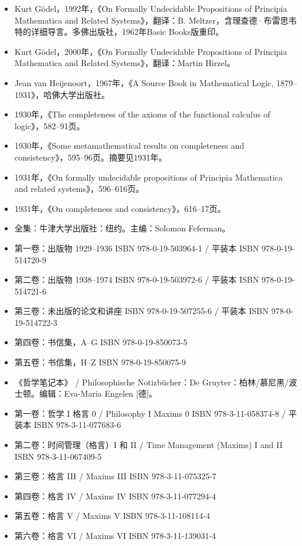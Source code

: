 \begin{itemize}
\item Kurt Gödel，1992年，《On Formally Undecidable Propositions of Principia Mathematica and Related Systems》，翻译：B. Meltzer，含理查德·布雷思韦特的详细导言。多佛出版社，1962年Basic Books版重印。  
\item Kurt Gödel，2000年，《On Formally Undecidable Propositions of Principia Mathematica and Related Systems》，翻译：Martin Hirzel。  
\item Jean van Heijenoort，1967年，《A Source Book in Mathematical Logic, 1879–1931》，哈佛大学出版社。  
\item 1930年，《The completeness of the axioms of the functional calculus of logic》，582–91页。  
\item 1930年，《Some metamathematical results on completeness and consistency》，595–96页。摘要见1931年。  
\item 1931年，《On formally undecidable propositions of Principia Mathematica and related systems》，596–616页。  
\item 1931年，《On completeness and consistency》，616–17页。
\end{itemize}  

\begin{itemize}
\item 全集：牛津大学出版社：纽约。主编：Solomon Feferman。  
\item 第一卷：出版物 1929–1936 ISBN 978-0-19-503964-1 / 平装本 ISBN 978-0-19-514720-9  
\item 第二卷：出版物 1938–1974 ISBN 978-0-19-503972-6 / 平装本 ISBN 978-0-19-514721-6  
\item 第三卷：未出版的论文和讲座 ISBN 978-0-19-507255-6 / 平装本 ISBN 978-0-19-514722-3  
\item 第四卷：书信集，A–G ISBN 978-0-19-850073-5  
\item 第五卷：书信集，H–Z ISBN 978-0-19-850075-9 
\item 《哲学笔记本》 / Philosophische Notizbücher：De Gruyter：柏林/慕尼黑/波士顿。编辑：Eva-Maria Engelen [德]。  
\item 第一卷：哲学 I 格言 0 / Philosophy I Maxims 0 ISBN 978-3-11-058374-8 / 平装本 ISBN 978-3-11-077683-6  
\item 第二卷：时间管理（格言）I 和 II / Time Management (Maxims) I and II ISBN 978-3-11-067409-5  
\item 第三卷：格言 III / Maxims III ISBN 978-3-11-075325-7  
\item 第四卷：格言 IV / Maxims IV ISBN 978-3-11-077294-4  
\item 第五卷：格言 V / Maxims V ISBN 978-3-11-108114-4  
\item 第六卷：格言 VI / Maxims VI ISBN 978-3-11-139031-4
\end{itemize}
